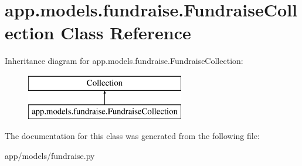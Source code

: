 \hypertarget{classapp_1_1models_1_1fundraise_1_1_fundraise_collection}{}\section{app.\+models.\+fundraise.\+Fundraise\+Collection Class Reference}
\label{classapp_1_1models_1_1fundraise_1_1_fundraise_collection}
Inheritance diagram for app.\+models.\+fundraise.\+Fundraise\+Collection\+:\begin{figure}[H]
\begin{center}
\leavevmode
\includegraphics[height=2.000000cm]{classapp_1_1models_1_1fundraise_1_1_fundraise_collection}
\end{center}
\end{figure}


The documentation for this class was generated from the following file\+:\begin{DoxyCompactItemize}
\item 
app/models/fundraise.\+py\end{DoxyCompactItemize}
